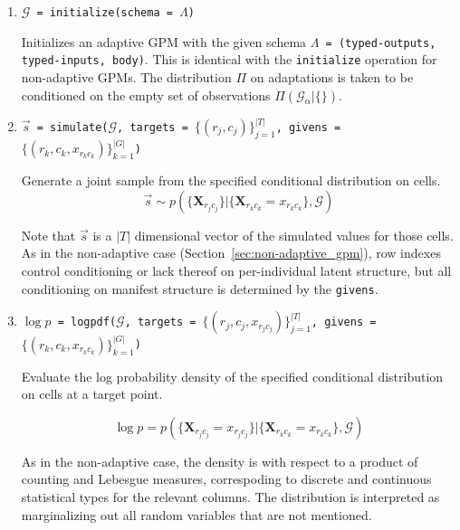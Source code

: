 \documentclass[10pt,letterpaper]{article}
\newcommand{\set}[1]{\{#1\}}
\newcommand{\G}{\mathcal{G}}
\begin{document}
\begin{enumerate}

\item \texttt{$\G$ = initialize(schema = $\Lambda$)}

    Initializes an adaptive GPM with the given schema \texttt{$\Lambda$ =
    (typed-outputs, typed-inputs, body)}.  This is identical with the
    \texttt{initialize} operation for non-adaptive GPMs.  The distribution $\Pi$
    on adaptations is taken to be conditioned on the empty set of observations
    $\Pi(\G_\alpha|\{\})$.
    

\item \texttt{$\vec{s}$ =
    simulate($\G$, targets = $\set{(r_j,c_j)}_{j=1}^{|T|}$, givens
    = $\set{(r_k, c_k, x_{r_kc_k})}_{k=1}^{|G|}$)}

    Generate a joint sample from the specified conditional
    distribution on cells.
    $$
    \vec{s} \sim p( \set{ \mathbf{X}_{r_jc_j} } |
    \set{ \mathbf{X}_{r_kc_k} = x_{r_kc_k} }, \G)
    $$

    Note that $\vec{s}$ is a $|T|$ dimensional vector of the simulated
    values for those cells.  As in the non-adaptive case
    (Section~\ref{sec:non-adaptive_gpm}), row indexes control conditioning
    or lack thereof on per-individual latent structure, but all conditioning
    on manifest structure is determined by the \texttt{givens}.
    

\item \texttt{$\log p$ =
    logpdf($\G$, targets = $\set{(r_j, c_j, x_{r_jc_j})}_{j=1}^{|T|}$,
    givens = $\set{(r_k, c_k, x_{r_kc_k})}_{k=1}^{|G|}$)}

    Evaluate the log probability density of the specified conditional
    distribution on cells at a target point.

    $$
    \log p = p( \set{ \mathbf{X}_{r_jc_j} = x_{r_jc_j} } |
    \set{ \mathbf{X}_{r_kc_k} = x_{r_kc_k} }, \G)
    $$

    As in the non-adaptive case, the density is with respect to a
    product of counting and Lebesgue measures, correspoding to
    discrete and continuous statistical types for the relevant
    columns.  The distribution is interpreted as marginalizing out all
    random variables that are not mentioned.


\end{enumerate}
\end{document}
